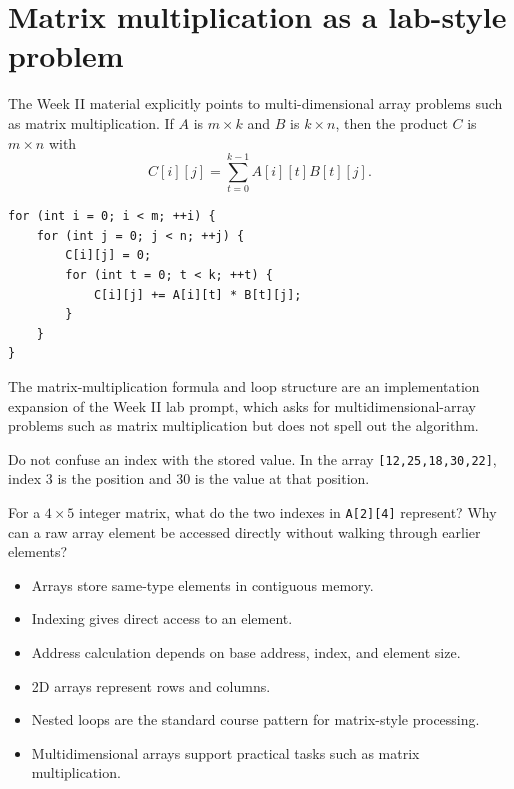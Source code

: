 \section{Matrix multiplication as a lab-style problem}

The Week II material explicitly points to multi-dimensional array problems such as matrix multiplication. If $A$ is $m\times k$ and $B$ is $k\times n$, then the product $C$ is $m\times n$ with
\[
C[i][j] = \sum_{t=0}^{k-1} A[i][t]B[t][j].
\]

\begin{lstlisting}
for (int i = 0; i < m; ++i) {
    for (int j = 0; j < n; ++j) {
        C[i][j] = 0;
        for (int t = 0; t < k; ++t) {
            C[i][j] += A[i][t] * B[t][j];
        }
    }
}
\end{lstlisting}

\begin{clarification}
The matrix-multiplication formula and loop structure are an implementation expansion of the Week II lab prompt, which asks for multidimensional-array problems such as matrix multiplication but does not spell out the algorithm.
\end{clarification}

\begin{pitfall}
Do not confuse an index with the stored value. In the array \texttt{[12,25,18,30,22]}, index 3 is the position and 30 is the value at that position.
\end{pitfall}

\begin{quickcheck}
For a $4\times5$ integer matrix, what do the two indexes in \texttt{A[2][4]} represent? Why can a raw array element be accessed directly without walking through earlier elements?
\end{quickcheck}

\begin{chapterrecap}
\begin{itemize}
  \item Arrays store same-type elements in contiguous memory.
  \item Indexing gives direct access to an element.
  \item Address calculation depends on base address, index, and element size.
  \item 2D arrays represent rows and columns.
  \item Nested loops are the standard course pattern for matrix-style processing.
  \item Multidimensional arrays support practical tasks such as matrix multiplication.
\end{itemize}
\end{chapterrecap}


